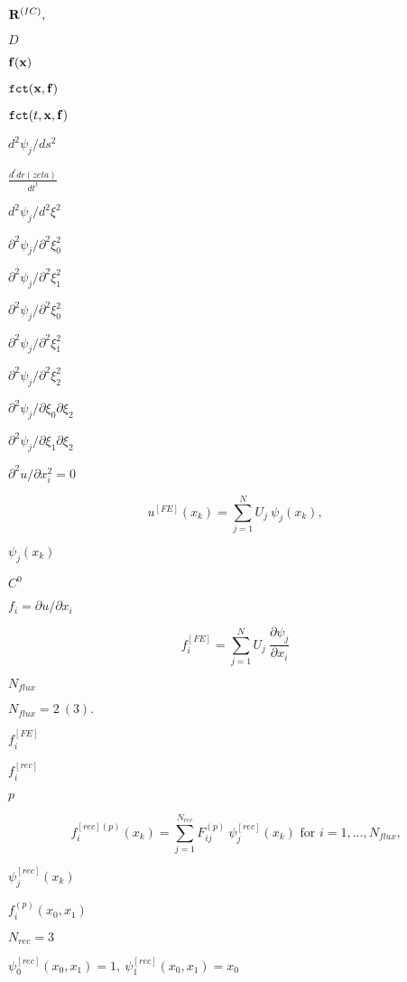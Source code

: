 \documentclass{article}
\begin{document}
$ {\bf R}^{(IC)},$
\pagebreak

$ D $
\pagebreak

$ {\bf f}({\bf x}) $
\pagebreak

$ \mbox{\tt fct}({\bf x}, {\bf f}) $
\pagebreak

$ \mbox{\tt fct}(t, {\bf x}, {\bf f}) $
\pagebreak

$ d^2 \psi_j / ds^2 $
\pagebreak

$ \frac{d^{t} dr(zeta)}{d t^{t}} $
\pagebreak

$ d^2 \psi_j / d^2 \xi^2 $
\pagebreak

$ \partial^2 \psi_j/\partial^2 \xi_0^2 $
\pagebreak

$ \partial^2 \psi_j/\partial^2 \xi_1^2 $
\pagebreak

$ \partial^2 \psi_j / \partial^2 \xi_0^2 $
\pagebreak

$ \partial^2 \psi_j / \partial^2 \xi_1^2 $
\pagebreak

$ \partial^2 \psi_j / \partial^2 \xi_2^2 $
\pagebreak

$ \partial^2 \psi_j / \partial \xi_0 \partial \xi_2 $
\pagebreak

$ \partial^2 \psi_j / \partial \xi_1 \partial \xi_2 $
\pagebreak

$ \partial^2 u/\partial x_i^2 = 0 $
\pagebreak

\[ u^{[FE]}(x_k) = \sum_{j=1}^{N} U_j \ \psi_j(x_k), \]
\pagebreak

$ \psi_j(x_k) $
\pagebreak

$ C^0 $
\pagebreak

$ f_i = \partial u/\partial x_i $
\pagebreak

\[ f_i^{[FE]} = \sum_{j=1}^{N} U_j \ \frac{\partial \psi_j}{\partial x_i} \]
\pagebreak

$N_{flux}$
\pagebreak

$N_{flux}=2 \ (3).$
\pagebreak

$ f_i^{[FE]} $
\pagebreak

$ f_i^{[rec]} $
\pagebreak

$p$
\pagebreak

\[ f^{[rec](p)}_i(x_k) = \sum_{j=1}^{N_{rec}} F^{(p)}_{ij} \ \psi^{[rec]}_j(x_k) \mbox{ \ \ \ for $i=1,...,N_{flux}$,} \]
\pagebreak

$ \psi^{[rec]}_j(x_k)$
\pagebreak

$ f^{(p)}_i(x_0,x_1) $
\pagebreak

$N_{rec}=3$
\pagebreak

$ \psi^{[rec]}_0(x_0,x_1)=1, \ \psi^{[rec]}_1(x_0,x_1)=x_0 $
\pagebreak
\end{document}

